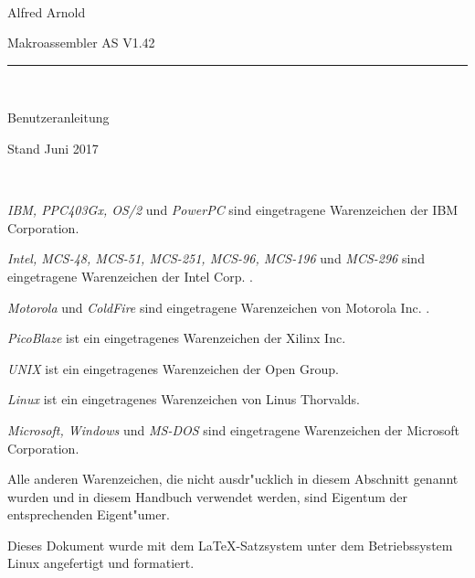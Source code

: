 \documentclass[12pt,a4paper,twoside]{report}
\begin{document}
\thispagestyle{empty}

\
\vspace{7cm}\par

\begin{raggedright}
{\large Alfred Arnold}\\
\vspace{1cm}\par
{\huge Makroassembler AS V1.42}\\
\rule{9.5cm}{0.3mm}\\
\vspace{2mm}\par
{\huge Benutzeranleitung}

\vspace{1cm}\par

{\large Stand Juni 2017}
\end{raggedright}

\clearpage
\thispagestyle{empty}

\ \vspace{4cm}

{\em IBM, PPC403Gx, OS/2} und {\em PowerPC} sind eingetragene Warenzeichen
der IBM Corporation.

{\em Intel, MCS-48, MCS-51, MCS-251, MCS-96, MCS-196} und {\em MCS-296}
sind eingetragene Warenzeichen der Intel Corp. .

{\em Motorola} und {\em ColdFire} sind eingetragene Warenzeichen von
Motorola Inc. .

{\em PicoBlaze} ist ein eingetragenes Warenzeichen der Xilinx Inc.

{\em UNIX} ist ein eingetragenes Warenzeichen der Open Group.

{\em Linux} ist ein eingetragenes Warenzeichen von Linus Thorvalds.

{\em Microsoft, Windows} und {\em MS-DOS} sind eingetragene Warenzeichen
der Microsoft Corporation.

Alle anderen Warenzeichen, die nicht ausdr"ucklich in diesem Abschnitt
genannt wurden und in diesem Handbuch verwendet werden, sind Eigentum
der entsprechenden Eigent"umer.

\vspace{6cm} 

Dieses Dokument wurde mit dem LaTeX-Satzsystem unter dem Betriebssystem
Linux angefertigt und formatiert.

\clearpage

\end{document}
